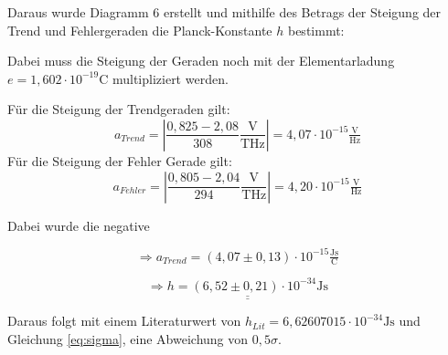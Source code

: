 Daraus wurde Diagramm 6 erstellt und mithilfe des Betrags der Steigung der Trend und Fehlergeraden die Planck-Konstante $h$ bestimmt:

Dabei muss die Steigung der Geraden noch mit der Elementarladung $e = 1,602 \cdot 10^{-19} \text{C}$
multipliziert werden.

Für die Steigung der Trendgeraden gilt:
\begin{equation}
    a_{Trend} = \left|\frac{0,825-2,08}{308} \frac{\text{V}}{\text{THz}}\right| = 4,07 \cdot 10^{-15} \tfrac{\text{V}}{\text{Hz}}
\end{equation}
Für die Steigung der Fehler Gerade gilt:
\begin{equation}
    a_{Fehler} = \left|\frac{0,805-2,04}{294}  \frac{\text{V}}{\text{THz}}\right| = 4,20 \cdot 10^{-15} \tfrac{\text{V}}{\text{Hz}}
\end{equation}

Dabei wurde die negative 

\[ \Rightarrow a_{Trend} = (4,07\pm0,13) \cdot 10^{-15}\tfrac{\text{Js}}{\text{C}}\]

\[ \Rightarrow \underline{\underline{h = (6,52 \pm 0,21 )\cdot 10^{-34} \text{Js}}}\]

Daraus folgt mit einem Literaturwert von $h_{Lit} =6,626 070 15 \cdot 10^{-34} \text{Js}$ und Gleichung \ref{eq:sigma}, eine
Abweichung von $0,5 \sigma$.

